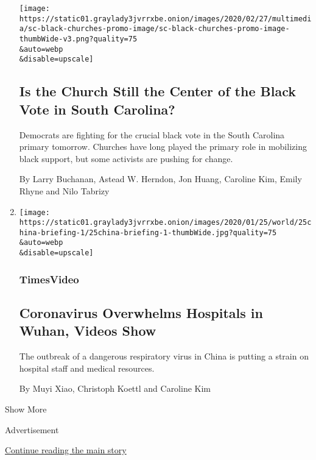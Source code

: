 \begin{enumerate}
  \texttt{[image: https://static01.graylady3jvrrxbe.onion/images/2020/02/27/multimedia/sc-black-churches-promo-image/sc-black-churches-promo-image-thumbWide-v3.png?quality=75\\\&auto=webp\\\&disable=upscale]}

  \hypertarget{is-the-church-still-the-center-of-the-black-vote-in-south-carolina}{%
  \subsection{Is the Church Still the Center of the Black Vote in South
  Carolina?}\label{is-the-church-still-the-center-of-the-black-vote-in-south-carolina}}

  Democrats are fighting for the crucial black vote in the South
  Carolina primary tomorrow. Churches have long played the primary role
  in mobilizing black support, but some activists are pushing for
  change.

  By Larry Buchanan, Astead W. Herndon, Jon Huang, Caroline Kim, Emily
  Rhyne and Nilo Tabrizy
\item
  \href{/video/world/asia/100000006936419/coronavirus-china-wuhan.html}{}

  \texttt{[image: https://static01.graylady3jvrrxbe.onion/images/2020/01/25/world/25china-briefing-1/25china-briefing-1-thumbWide.jpg?quality=75\\\&auto=webp\\\&disable=upscale]}

  \hypertarget{timesvideo-7}{%
  \subsubsection{TimesVideo}\label{timesvideo-7}}

  \hypertarget{coronavirus-overwhelms-hospitals-in-wuhan-videos-show}{%
  \subsection{Coronavirus Overwhelms Hospitals in Wuhan, Videos
  Show}\label{coronavirus-overwhelms-hospitals-in-wuhan-videos-show}}

  The outbreak of a dangerous respiratory virus in China is putting a
  strain on hospital staff and medical resources.

  By Muyi Xiao, Christoph Koettl and Caroline Kim
\end{enumerate}

Show More

Advertisement

\protect\hyperlink{after-mid2}{Continue reading the main story}

